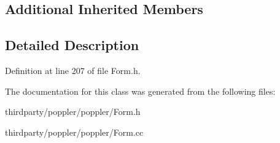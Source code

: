 \subsection*{Additional Inherited Members}


\subsection{Detailed Description}


Definition at line 207 of file Form.\+h.



The documentation for this class was generated from the following files\+:\begin{DoxyCompactItemize}
\item 
thirdparty/poppler/poppler/Form.\+h\item 
thirdparty/poppler/poppler/Form.\+cc\end{DoxyCompactItemize}
